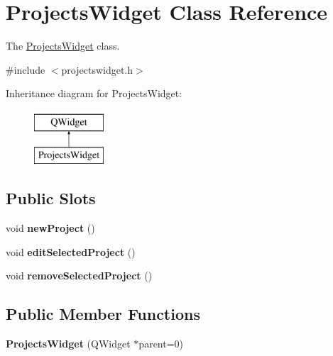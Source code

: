 \hypertarget{classProjectsWidget}{\section{Projects\+Widget Class Reference}
\label{classProjectsWidget}
}


The \hyperlink{classProjectsWidget}{Projects\+Widget} class.  




{\ttfamily \#include $<$projectswidget.\+h$>$}

Inheritance diagram for Projects\+Widget\+:\begin{figure}[H]
\begin{center}
\leavevmode
\includegraphics[height=2.000000cm]{de/da7/classProjectsWidget}
\end{center}
\end{figure}
\subsection*{Public Slots}
\begin{DoxyCompactItemize}
\item 
\hypertarget{classProjectsWidget_a9a3e158093ed435a68d4d9874a22a128}{void {\bfseries new\+Project} ()}\label{classProjectsWidget_a9a3e158093ed435a68d4d9874a22a128}

\item 
\hypertarget{classProjectsWidget_a026e17f035717e382f4afca6896a72d3}{void {\bfseries edit\+Selected\+Project} ()}\label{classProjectsWidget_a026e17f035717e382f4afca6896a72d3}

\item 
\hypertarget{classProjectsWidget_a038205ca1dee68dadae84e31dabfd7fc}{void {\bfseries remove\+Selected\+Project} ()}\label{classProjectsWidget_a038205ca1dee68dadae84e31dabfd7fc}

\end{DoxyCompactItemize}
\subsection*{Public Member Functions}
\begin{DoxyCompactItemize}
\item 
\hypertarget{classProjectsWidget_a542fb678c61897b56c86dc58524bd969}{{\bfseries Projects\+Widget} (Q\+Widget $\ast$parent=0)}\label{classProjectsWidget_a542fb678c61897b56c86dc58524bd969}

\end{DoxyCompactItemize}


